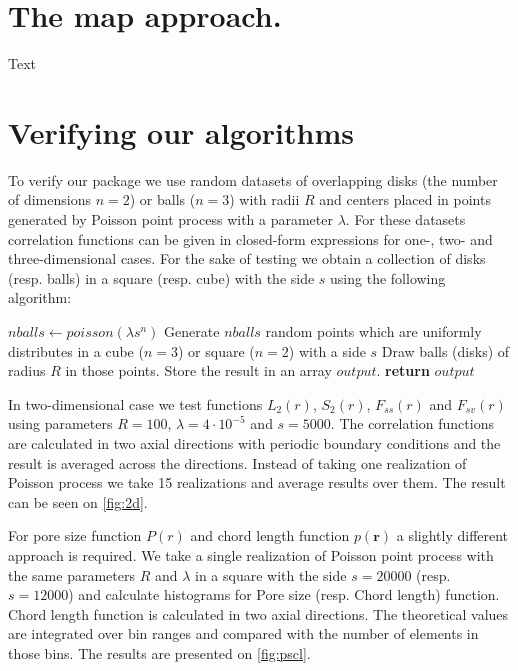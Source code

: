 \documentclass[reprint,amsmath,amssymb,aps,pre]{revtex4-1}
\begin{document}
\section{The map approach.}
\label{mapsec}
Text

\section{Verifying our algorithms}
\label{verisec}
To verify our package we use random datasets of overlapping disks (the number of
dimensions $n = 2$) or balls ($n = 3$) with radii $R$ and centers placed in
points generated by Poisson point process with a parameter $\lambda$. For these
datasets correlation functions can be given in closed-form expressions for one-,
two- and three-dimensional cases. For the sake of testing we obtain a collection
of disks (resp. balls) in a square (resp. cube) with the side $s$ using the
following algorithm:
\begin{algorithmic}[1]
  \label{testdata}
    \State $nballs \gets poisson(\lambda s^n)$ 
    \State Generate $nballs$ random points which are uniformly distributes in
    a cube ($n = 3$) or square ($n = 2$) with a side $s$
    \State Draw balls (disks) of radius $R$ in those points. Store the result in
    an array $output$.
    \State \textbf{return} $output$
  \EndProcedure
\end{algorithmic}

In two-dimensional case we test functions $L_2(r)$, $S_2(r)$, $F_{ss}(r)$ and
$F_{sv}(r)$ using parameters $R = 100$, $\lambda = 4\cdot10^{-5}$ and
$s = 5000$. The correlation functions are calculated in two axial directions
with periodic boundary conditions and the result is averaged across the
directions. Instead of taking one realization of Poisson process we take 15
realizations and average results over them. The result can be seen on
\cref{fig:2d}.

For pore size function $P(r)$ and chord length function $p(\bm{r})$ a slightly
different approach is required. We take a single realization of Poisson point
process with the same parameters $R$ and $\lambda$ in a square with the side
$s = 20000$ (resp. $s = 12000$) and calculate histograms for Pore size
(resp. Chord length) function. Chord length function is calculated in two axial
directions. The theoretical values are integrated over bin ranges and compared
with the number of elements in those bins. The results are presented on
\cref{fig:pscl}.
\end{document}
